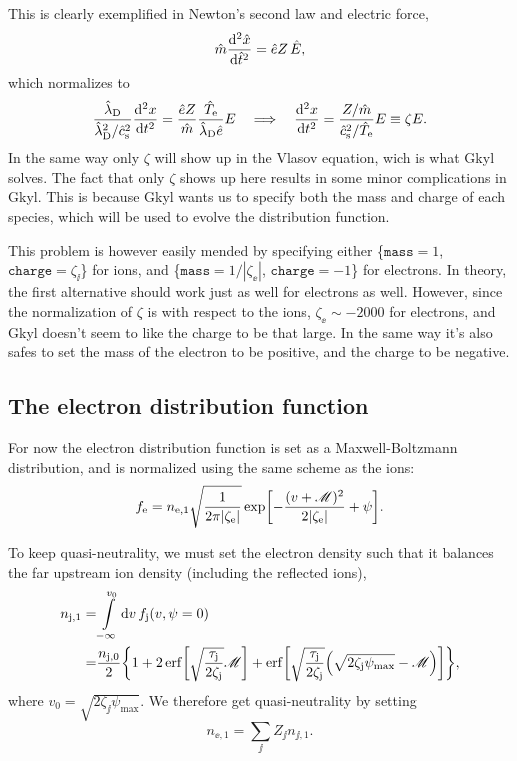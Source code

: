\documentclass[11pt,a4paper, 
swedish, english %
]{article}
\begin{document}
This is clearly exemplified in Newton's second law and electric force,
\begin{equation}\label{eq:hat_NewtonII}
\hat{m}\dv[2]{\hat{x}}{\hat{t}}=\hat{e}Z\,\hat{E},
\end{equation}
which normalizes to
\begin{equation}
\frac{\hat{\lambda}_{\text{D}}}{\hat{\lambda}_{\text{D}}^2/\hat{c}_{\text{s}}^2}\dv[2]{x}{t}
=\frac{\hat{e}Z}{\hat{m}} \frac{\hat{T}_{\mathrm{e}}}{\hat{\lambda}_{\text{D}}\hat{e}}E
\quad\Longrightarrow\quad
\dv[2]{x}{t}
=\frac{Z/\hat{m}}{\hat{c}_{\text{s}}^2/\hat{T}_{\mathrm{e}}} E
\equiv \zeta E.
\end{equation}
In the same way only $\zeta$ will show up in the Vlasov equation, wich
is what Gkyl solves. The fact that only $\zeta$ shows up here results
in some minor complications in Gkyl. This is because Gkyl wants us to
specify both the mass and charge of each species, which will
be used to evolve the distribution function.

This problem is however
easily mended by specifying either 
\{$\mathtt{mass}=1$, $\mathtt{charge}=\zeta_{\ii}$\} for ions, and 
\{$\mathtt{mass}=1/|\zeta_{\ee}|$, $\mathtt{charge}=-1$\} for electrons. In
theory, the first alternative should work just as well for electrons
as well. However, since the normalization of $\zeta$ is with respect
to the ions, $\zeta_{\ee}\sim-2000$ for electrons, and Gkyl doesn't seem to
like the charge to be that large. In the same way it's also safes to
set the mass of the electron to be positive, and the charge to be
negative.

\subsection{The electron distribution function}
For now the electron distribution function is set as a
Maxwell-Boltzmann distribution, and is normalized using the same
scheme as the ions:
\begin{equation}\label{eq:fe}
f_{\mathrm{e}} = n_{\mathrm{e},1}\sqrt{\frac{1}{2\pi|\zeta_{\mathrm{e}}|}}
\exp[-\frac{(v+\mathscr{M})^2}{2|\zeta_{\mathrm{e}}|}+\psi].
\end{equation}

To keep quasi-neutrality, we must set the electron density such that
it balances the far upstream ion density (including the reflected
ions),
\begin{equation}\label{eq:nj1}
\begin{aligned}
n_{\jj,1} =& \int_{-\infty}^{v_0}\rd{v}\,f_{\jj}(v,\psi=0)\\
=&\frac{n_{\jj,0}}{2}
\qty{
  1+2\erf[\sqrt{\frac{\tau_{\jj}}{2\zeta_{\jj}}}\M]
  +\erf[\sqrt{\frac{\tau_{\jj}}{2\zeta_{\jj}}}
  \qty(\sqrt{2\zeta_{\jj}\psi_{\max}}-\M)]
},
\end{aligned}
\end{equation}
where $v_0=\sqrt{2\zeta_{\jj}\psi_{\max}}$. We therefore get
quasi-neutrality by setting
\begin{equation}\label{eq:ne1}
n_{\ee,1} = \sum_{\jj} Z_{\jj}n_{\jj,1}.
\end{equation}
\end{document}
